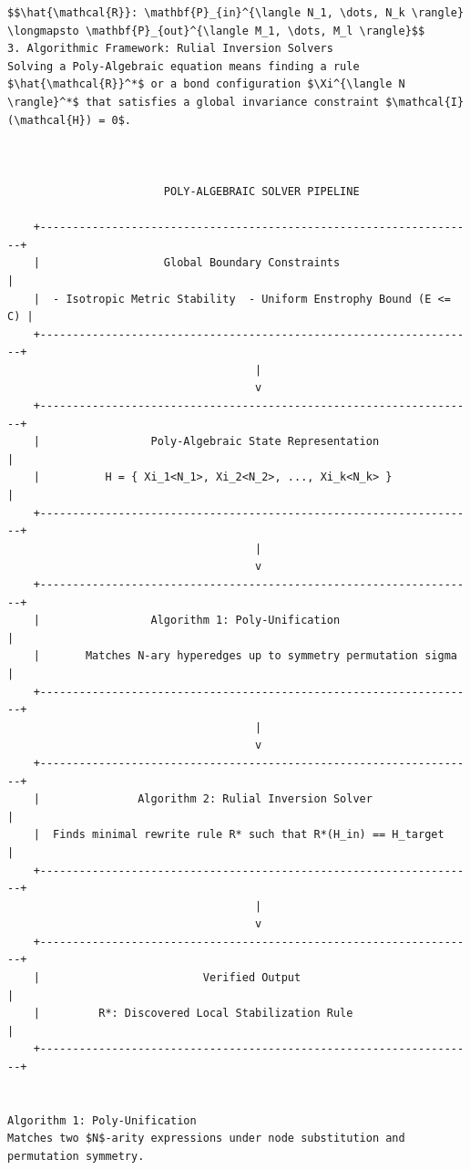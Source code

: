 \documentclass[11pt,a4paper]{article}
\begin{document}
\begin{lstlisting}[language={}, caption={}, basicstyle=\ttfamily\footnotesize, breaklines=true]
$$\hat{\mathcal{R}}: \mathbf{P}_{in}^{\langle N_1, \dots, N_k \rangle} \longmapsto \mathbf{P}_{out}^{\langle M_1, \dots, M_l \rangle}$$
3. Algorithmic Framework: Rulial Inversion Solvers
Solving a Poly-Algebraic equation means finding a rule $\hat{\mathcal{R}}^*$ or a bond configuration $\Xi^{\langle N \rangle}^*$ that satisfies a global invariance constraint $\mathcal{I}(\mathcal{H}) = 0$.



                        POLY-ALGEBRAIC SOLVER PIPELINE
                        
    +-------------------------------------------------------------------+
    |                   Global Boundary Constraints                      |
    |  - Isotropic Metric Stability  - Uniform Enstrophy Bound (E <= C) |
    +-------------------------------------------------------------------+
                                      |
                                      v
    +-------------------------------------------------------------------+
    |                 Poly-Algebraic State Representation               |
    |          H = { Xi_1<N_1>, Xi_2<N_2>, ..., Xi_k<N_k> }             |
    +-------------------------------------------------------------------+
                                      |
                                      v
    +-------------------------------------------------------------------+
    |                 Algorithm 1: Poly-Unification                     |
    |       Matches N-ary hyperedges up to symmetry permutation sigma   |
    +-------------------------------------------------------------------+
                                      |
                                      v
    +-------------------------------------------------------------------+
    |               Algorithm 2: Rulial Inversion Solver                |
    |  Finds minimal rewrite rule R* such that R*(H_in) == H_target     |
    +-------------------------------------------------------------------+
                                      |
                                      v
    +-------------------------------------------------------------------+
    |                         Verified Output                           |
    |         R*: Discovered Local Stabilization Rule                   |
    +-------------------------------------------------------------------+


Algorithm 1: Poly-Unification
Matches two $N$-arity expressions under node substitution and permutation symmetry.




\end{lstlisting}
\end{document}
